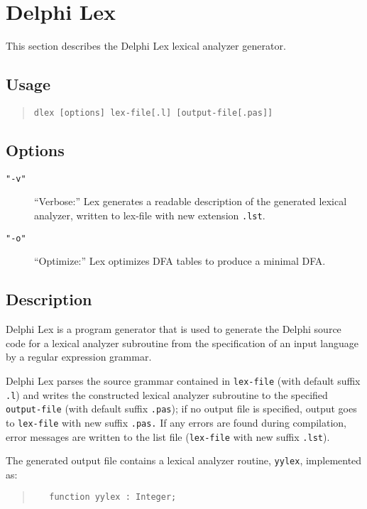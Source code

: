 \documentclass[a4paper]{article}
\begin{document}
\newpage

\section{Delphi Lex}

This section describes the Delphi Lex lexical analyzer generator.

\subsection{Usage}

\begin{quote}\begin{verbatim}
dlex [options] lex-file[.l] [output-file[.pas]]
\end{verbatim}\end{quote}

\subsection{Options}

\begin{description}
   \item[\tt"-v"]
      ``Verbose:'' Lex generates a readable description of the generated
      lexical analyzer, written to lex-file with new extension \verb".lst".
   \item[\tt"-o"]
      ``Optimize:'' Lex optimizes DFA tables to produce a minimal DFA.
\end{description}

\subsection{Description}

Delphi Lex is a program generator that is used to generate the Delphi
source code for a lexical analyzer subroutine from the specification
of an input language by a regular expression grammar.

Delphi Lex parses the source grammar contained in \verb"lex-file" (with default
suffix \verb".l") and writes the constructed lexical analyzer subroutine
to the specified \verb"output-file" (with default suffix \verb".pas"); if no
output file is specified, output goes to \verb"lex-file" with new suffix
\verb".pas." If any errors are found during compilation, error messages are
written to the list file (\verb"lex-file" with new suffix \verb".lst").

The generated output file contains a lexical analyzer routine, \verb"yylex",
implemented as:
\begin{quote}\begin{verbatim}
   function yylex : Integer;
\end{verbatim}\end{quote}
\end{document}

